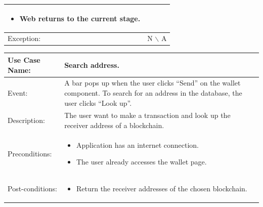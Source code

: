 \begin{table}[]
\begin{tabular}{m{4cm} m{11cm}}
\begin{itemize}
                  \begin{itemize}
                      \item Web returns to the current stage.
                  \end{itemize}
        \end{itemize}                                                                       \\ 
        \midrule 
        Exception:         &   N $\backslash$ A                                                  \\ 
        \bottomrule
    \end{tabular}
\end{table}
\clearpage

\begin{table}[]
    \begin{tabular}{m{4cm}  m{11cm}}
        \toprule
        Use Case Name:     & Search address.                                                                                                                         \\ 
        \midrule 
        Event:             & A bar pops up when the user clicks “Send” on the wallet component. To search for an address in the database, the user clicks “Look up”. \\ 
        \midrule 
        Description:       & The user want to make a transaction and look up the receiver address of a blockchain.                                                   \\ 
        \midrule 
        Preconditions:     & \begin{itemize}
            \item Application has an internet connection.
            \item The user already accesses the wallet page.
        \end{itemize}                                                                                                              \\ 
        \midrule 
        Post-conditions:   & \begin{itemize}
            \item Return the receiver addresses of the chosen blockchain.
        \end{itemize}                                                                                                              \\ 
        \midrule 

\end{tabular}
\end{table}
